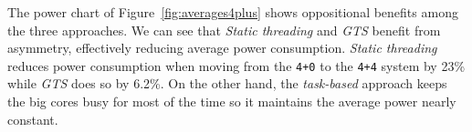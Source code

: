 
The power chart of Figure~\ref{fig:averages4plus} shows oppositional benefits among the three approaches. We can see that \emph{Static threading} and \emph{GTS} benefit from asymmetry, effectively reducing average power consumption.
\emph{Static threading} reduces power consumption when moving from the \texttt{4+0} to the \texttt{4+4} system by 23\% while \emph{GTS} does so by 6.2\%.
On the other hand, the \emph{task-based} approach keeps the big cores busy for most of the time so it maintains the average power nearly constant.




